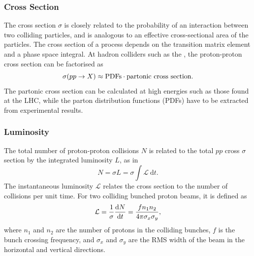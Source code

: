 \subsubsection{Cross Section}
The cross section $\sigma$ is closely related to the probability of an interaction between two colliding particles, and is analogous to an effective cross-sectional area of the particles.
The cross section of a process depends on the transition matrix element and a phase space integral.
At hadron colliders such as the \LHC, the proton-proton cross section can be factorised as 
%
\begin{equation}
  \sigma(pp \to X) \approx \textnormal{PDFs} \cdot \textnormal{partonic cross section} .
\end{equation}
%
The partonic cross section can be calculated at high energies such as those found at the LHC, while the parton distribution functions (PDFs) have to be extracted from experimental results. 

\subsubsection{Luminosity}
The total number of proton-proton collisions $N$ is related to the total $pp$ cross $\sigma$ section by the integrated luminosity $L$, as in
%
\begin{equation}
  N = \sigma L = \sigma \int \mathcal{L} ~\mathrm{d}t .
\end{equation}
%
The instantaneous luminosity $\mathcal{L}$ relates the cross section to the number of collisions per unit time.
For two colliding bunched proton beams, it is defined as
%
\begin{equation}\label{eq:lumi_def}
  \mathcal{L} = \frac{1}{\sigma} \der{N}{t} = \frac{f n_1 n_2}{4 \pi \sigma_x \sigma_y},
\end{equation}
%
where $n_1$ and $n_2$ are the number of protons in the colliding bunches, $f$ is the bunch crossing frequency, and $\sigma_x$ and $\sigma_y$ are the RMS width of the beam in the horizontal and vertical directions.

